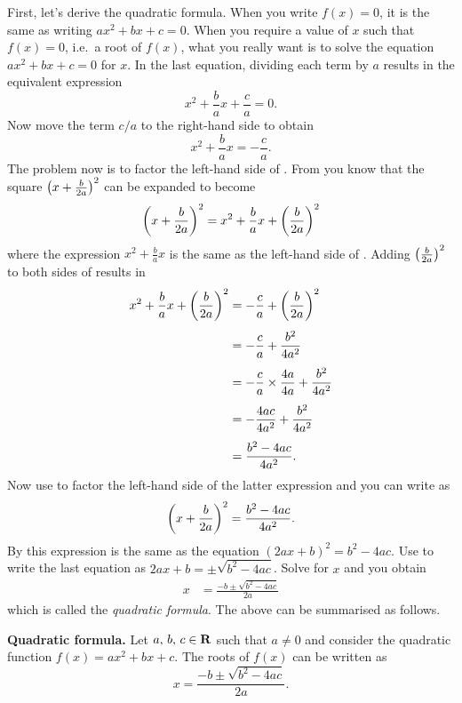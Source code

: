 \documentclass[a4paper,oneside,12pt]{article}
\begin{document}
First, let's derive the quadratic formula.  When you write $f(x) = 0$,
it is the same as writing $ax^2 + bx + c = 0$.  When you require a
value of $x$ such that $f(x) = 0$, i.e.~a root of $f(x)$, what you
really want is to solve the equation $ax^2 + bx + c = 0$ for $x$.  In
the last equation, dividing each term by $a$ results in the equivalent
expression
\[
x^2 + \frac{b}{a} x + \frac{c}{a}
=
0.
\]
Now move the term $c/a$ to the right-hand side to obtain
\begin{equation}
\label{eqn:quadratic_formula_factor_LHS}
x^2 + \frac{b}{a} x
=
-\frac{c}{a}.
\end{equation}
The problem now is to factor the left-hand side of
.  From
 you know that the square
$\parenthesis*{x + \frac{b}{2a}}^2$ can be expanded to become
\[
\parenthesis*{x + \frac{b}{2a}}^2
=
x^2 + \frac{b}{a} x + \parenthesis*{\frac{b}{2a}}^2
\]
where the expression $x^2 + \frac{b}{a} x$ is the same as the
left-hand side of .  Adding
$\parenthesis*{\frac{b}{2a}}^2$ to both sides of
 results in
\begin{align*}
x^2 + \frac{b}{a} x + \parenthesis*{\frac{b}{2a}}^2
&=
-\frac{c}{a} + \parenthesis*{\frac{b}{2a}}^2 \\[4pt]
&=
-\frac{c}{a} + \frac{b^2}{4a^2} \\[4pt]
&=
-\frac{c}{a} \times \frac{4a}{4a} + \frac{b^2}{4a^2} \\[4pt]
&=
-\frac{4ac}{4a^2} + \frac{b^2}{4a^2} \\[4pt]
&=
\frac{
  b^2 - 4ac
}{
  4a^2
}.
\end{align*}
Now use  to factor the left-hand
side of the latter expression and you can write
 as
\[
\parenthesis*{x + \frac{b}{2a}}^2
=
\frac{
  b^2 - 4ac
}{
  4a^2
}.
\]
By  this expression is the
same as the equation $(2ax + b)^2 = b^2 - 4ac$.  Use
 to write the last
equation as $2ax + b = \pm\sqrt{b^2 - 4ac}$.  Solve for $x$ and you
obtain
\begin{align*}
x
&=
\frac{
  -b \pm \sqrt{b^2 - 4ac}
}{
  2a
}
\end{align*}
which is called the \emph{quadratic formula}.  The above can be
summarised as follows.

\begin{theorem}
\label{thm:quadratic_formula}
\textbf{Quadratic formula.}
Let $\triple{a}{b}{c} \in \RR$ such that $a \neq 0$ and consider the
quadratic function $f(x) = ax^2 + bx + c$.  The roots of $f(x)$ can be
written as
\begin{equation}
\label{eqn:quadratic_formula}
x
=
\frac{
  -b \pm \sqrt{b^2 - 4ac}
}{
  2a
}.
\end{equation}
\end{theorem}
\end{document}
